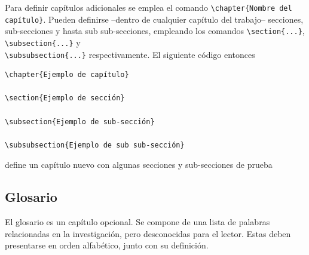 Para definir capítulos adicionales se emplea el comando \verb|\chapter{Nombre del capítulo}|. Pueden definirse --dentro de cualquier capítulo del trabajo-- secciones, sub-secciones y hasta sub sub-secciones, empleando los comandos \verb|\section{...}|, \verb|\subsection{...}| y \\ \verb|\subsubsection{...}| respectivamente. El siguiente código entonces
\begin{verbatim}
\chapter{Ejemplo de capítulo}

\section{Ejemplo de sección}

\subsection{Ejemplo de sub-sección}

\subsubsection{Ejemplo de sub sub-sección}
\end{verbatim}

define un capítulo nuevo con algunas secciones y sub-secciones de prueba

\subsection{Glosario}

El glosario es un capítulo opcional. Se compone de una lista de palabras relacionadas en la investigación, pero desconocidas para el lector. Estas deben presentarse en orden alfabético, junto con su definición. 

